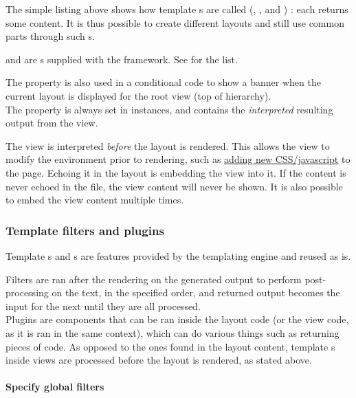 \documentclass[pdftex,12pt,a4paper]{article}
\begin{document}
The simple listing above shows how template s are called (, ,  and ) : each returns some content. It is thus possible to create different layouts and still use common parts through such s.
\begin{note}
   and  are s supplied with the framework. See  for the list.
\end{note}
The  property is also used in a conditional code to show a banner when the current layout is displayed for the root view (top of hierarchy).\\
The property  is always set in  instances, and contains the \emph{interpreted} resulting output from the view.

The view  is interpreted \emph{before} the layout is rendered. This allows the view to modify the environment prior to rendering, such as \hyperref[sec:managing-stylesheets-and-scripts]{adding new CSS/javascript} to the page. Echoing it in the layout is embedding the view into it. If the content is never echoed in the file, the view content will never be shown. It is also possible to embed the view content multiple times.

\subsubsection{Template filters and plugins} \label{sec:template-filters-and-plugins}

Template s and s are features provided by the  templating engine and reused as is.

Filters are ran after the rendering on the generated output to perform post-processing on the text, in the specified order, and returned output becomes the input for the next  until they are all processed.\\
Plugins are components that can be ran inside the layout code (or the view code, as it is ran in the same context), which can do various things such as returning pieces of code. As opposed to the ones found in the layout content, template s inside views are processed before the layout is rendered, as stated above.

\paragraph{Specify global filters}
\end{document}
